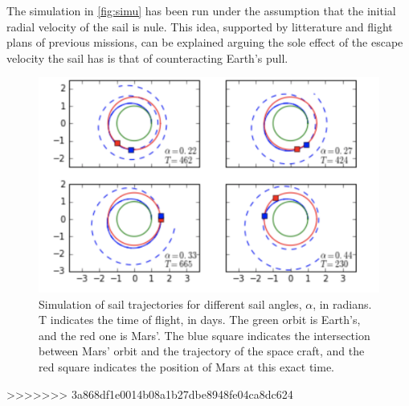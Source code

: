 \documentclass[twocolumn,12pt,a4paper]{article}
\numberwithin{equation}{section}
\begin{document}
The simulation in  \autoref{fig:simu} has been run under the assumption that the initial radial velocity of the sail is nule. This idea, supported by litterature and flight plans of previous missions, can be explained arguing the sole effect of the escape velocity the sail has is that of counteracting Earth's pull.

\begin{figure}
	\centering
	\includegraphics[scale=0.7]{simulacionsvaries.png}
	\caption{Simulation of sail trajectories for different sail angles, $\alpha$, in radians. T indicates the time of flight, in days. The green orbit is Earth's, and the red one is Mars'. The blue square indicates the intersection between Mars' orbit and the trajectory of the space craft, and the red square indicates the position of Mars at this exact time. }
	\label{fig:espirals}
\end{figure}


>>>>>>> 3a868df1e0014b08a1b27dbe8948fe04ca8dc624


\end{document}
